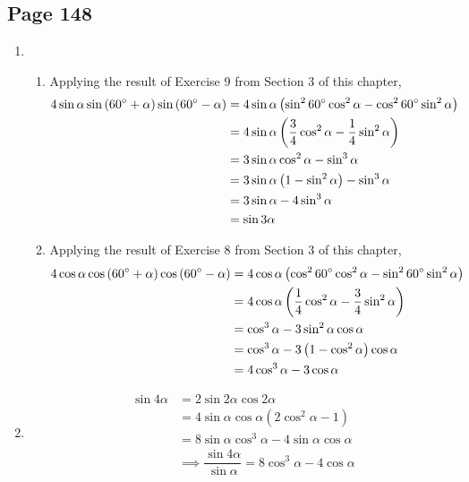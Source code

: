 \documentclass{article}
\newenvironment{solutions}[1]
{\subsection*{#1}
 \begin{enumerate}[leftmargin=1.5em]}
{\end{enumerate}}
\newcommand{\solution}{\item}
\newenvironment{subsolutions}
{\begin{enumerate}}
{\end{enumerate}}
\newcommand{\subsolution}{\item}
\begin{document}
\begin{solutions}{Page 148}
Alternatively, using the result from the previous exercise,
\begin{align*}
\dfrac{\sin{3\alpha}}{\sin{\alpha}} - \dfrac{\cos{3\alpha}}{\cos{\alpha}} &= \dfrac{\sin{3\alpha}\cos{\alpha}-\cos{3\alpha}\sin{\alpha}}{\sin{\alpha}\cos{\alpha}} \\
&= \dfrac{\sin{2\alpha}}{\sin{\alpha}\cos{\alpha}} \\
&= \dfrac{2\sin{\alpha}\cos{\alpha}}{\sin{\alpha}\cos{\alpha}} \\
&= 2
\end{align*}

\solution %
\begin{subsolutions}
\subsolution %
Applying the result of Exercise 9 from Section 3 of this chapter,
\begin{align*}
4\sin{\alpha}\sin\left(60\degree+\alpha\right)\sin\left(60\degree-\alpha\right) &= 4\sin{\alpha}\left(\sin^{2}{60\degree}\cos^{2}{\alpha} - \cos^{2}{60\degree}\sin^{2}{\alpha}\right) \\
&= 4\sin{\alpha}\left(\dfrac{3}{4}\cos^{2}{\alpha} - \dfrac{1}{4}\sin^{2}{\alpha}\right) \\
&= 3\sin{\alpha}\cos^{2}{\alpha} - \sin^{3}{\alpha} \\
&= 3\sin{\alpha}\left(1-\sin^{2}{\alpha}\right)  - \sin^{3}{\alpha} \\
&= 3\sin{\alpha}-4\sin^{3}{\alpha}  \\
&= \sin{3\alpha}
\end{align*}

\subsolution %
Applying the result of Exercise 8 from Section 3 of this chapter,
\begin{align*}
4\cos{\alpha}\cos\left(60\degree+\alpha\right)\cos\left(60\degree-\alpha\right) &= 4\cos{\alpha}\left(\cos^{2}{60\degree}\cos^{2}{\alpha} - \sin^{2}{60\degree}\sin^{2}{\alpha}\right) \\
&= 4\cos{\alpha}\left(\dfrac{1}{4}\cos^{2}{\alpha} - \dfrac{3}{4}\sin^{2}{\alpha}\right) \\
&= \cos^{3}{\alpha} - 3\sin^{2}{\alpha}\cos{\alpha} \\
&= \cos^{3}{\alpha} - 3\left(1-\cos^{2}{\alpha}\right)\cos{\alpha} \\
&= 4\cos^{3}{\alpha} - 3\cos{\alpha}
\end{align*}

\end{subsolutions}

\solution %
\begin{align*}
\sin{4\alpha} &= 2\sin{2\alpha}\cos{2\alpha} \\
&=4\sin{\alpha}\cos{\alpha}\left(2\cos^{2}{\alpha}-1\right) \\
&= 8\sin{\alpha}\cos^{3}{\alpha}-4\sin{\alpha}\cos{\alpha} \\
&\implies \dfrac{\sin{4\alpha}}{\sin{\alpha}} = 8\cos^{3}{\alpha}-4\cos{\alpha} 
\end{align*}


\end{solutions}
\end{document}
